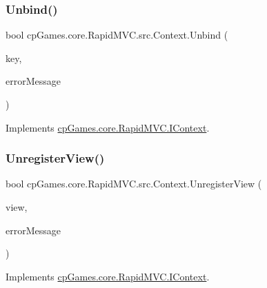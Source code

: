 \mbox{\label{classcp_games_1_1core_1_1_rapid_m_v_c_1_1src_1_1_context_a7de73496fa8c30c2dfc84cb3e58c7543}} 
\subsubsection{\texorpdfstring{Unbind()}{Unbind()}}
{\footnotesize\ttfamily bool cp\+Games.\+core.\+Rapid\+M\+V\+C.\+src.\+Context.\+Unbind (\begin{DoxyParamCaption}\item[{\mbox{\hyperlink{interfacecp_games_1_1core_1_1_rapid_m_v_c_1_1_i_binding_key}{I\+Binding\+Key}}}]{key,  }\item[{out string}]{error\+Message }\end{DoxyParamCaption})}



Implements \mbox{\hyperlink{interfacecp_games_1_1core_1_1_rapid_m_v_c_1_1_i_context_abfff82911155824da32f84d8647d9e56}{cp\+Games.\+core.\+Rapid\+M\+V\+C.\+I\+Context}}.

\mbox{\label{classcp_games_1_1core_1_1_rapid_m_v_c_1_1src_1_1_context_a5f033c640e3b84d53ff2bf330e2baf58}} 
\subsubsection{\texorpdfstring{UnregisterView()}{UnregisterView()}}
{\footnotesize\ttfamily bool cp\+Games.\+core.\+Rapid\+M\+V\+C.\+src.\+Context.\+Unregister\+View (\begin{DoxyParamCaption}\item[{\mbox{\hyperlink{interfacecp_games_1_1core_1_1_rapid_m_v_c_1_1_i_view}{I\+View}}}]{view,  }\item[{out string}]{error\+Message }\end{DoxyParamCaption})}



Implements \mbox{\hyperlink{interfacecp_games_1_1core_1_1_rapid_m_v_c_1_1_i_context_a86f05401110f08cbc79a83fd4366d505}{cp\+Games.\+core.\+Rapid\+M\+V\+C.\+I\+Context}}.



